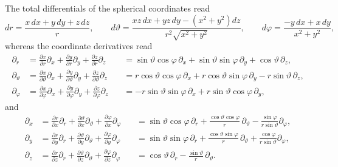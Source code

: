 \documentclass[10pt,twoside,notitlepage,a4paper,fleqn,openbib]{report}
\def\dst{\displaystyle}
\def\pdiff#1#2{\dst\frac{\partial#1}{\partial #2}}
\begin{document}
The total differentials of the spherical coordinates read
\begin{equation}
  dr         = \frac{x\,dx+y\,dy + z\,dz}{r}, \qquad
  d\vartheta = \frac{xz\,dx+yz\,dy-(x^2+y^2)dz}{r^2\sqrt{x^2+y^2}},\qquad
  d\varphi   = \frac{-y\,dx+x\,dy}{x^2+y^2},
\end{equation}
whereas the coordinate derivatives read
\begin{subequations}
\begin{alignat}{3}
  \partial_r &= \pdiff{x}{r}\partial_x+\pdiff{y}{r}\partial_y+\pdiff{z}{r}\partial_z  &\, &= \sin\vartheta\cos\varphi\,\partial_x+\sin\vartheta\sin\varphi\,\partial_y+\cos\vartheta\,\partial_z,\\[0.5em]
  \partial_{\vartheta} &= \pdiff{x}{\vartheta}\partial_x+\pdiff{y}{\vartheta}\partial_y+\pdiff{z}{\vartheta}\partial_z &\, &= r\cos\vartheta\cos\varphi\,\partial_x+r\cos\vartheta\sin\varphi\,\partial_y-r\sin\vartheta\,\partial_z,\\[0.5em]
  \partial_{\varphi} &= \pdiff{x}{\varphi}\partial_x+\pdiff{y}{\varphi}\partial_y+\pdiff{z}{\varphi}\partial_z &\, &= -r\sin\vartheta\sin\varphi\,\partial_x+r\sin\vartheta\cos\varphi\,\partial_y,
\end{alignat} 
\end{subequations}
and
\begin{subequations}
\begin{alignat}{3}
  \partial_x &= \pdiff{r}{x}\partial_r+\pdiff{\vartheta}{x}\partial_{\vartheta}+\pdiff{\varphi}{x}\partial_{\varphi} &\, &= \sin\vartheta\cos\varphi\,\partial_r+\frac{\cos\vartheta\cos\varphi}{r}\,\partial_{\vartheta}-\frac{\sin\varphi}{r\sin\vartheta}\partial_{\varphi},\\[0.5em]
  \partial_y &= \pdiff{r}{y}\partial_r+\pdiff{\vartheta}{y}\partial_{\vartheta}+\pdiff{\varphi}{y}\partial_{\varphi} &\, &= \sin\vartheta\sin\varphi\,\partial_r+\frac{\cos\vartheta\sin\varphi}{r}\,\partial_{\vartheta}+\frac{\cos\varphi}{r\sin\vartheta}\partial_{\varphi},\\[0.5em]
  \partial_z &= \pdiff{r}{z}\partial_r+\pdiff{\vartheta}{z}\partial_{\vartheta}+\pdiff{\varphi}{z}\partial_{\varphi} &\, &= \cos\vartheta\,\partial_r-\frac{\sin\vartheta}{r}\,\partial_{\vartheta}.
\end{alignat}
\end{subequations}

\end{document}
